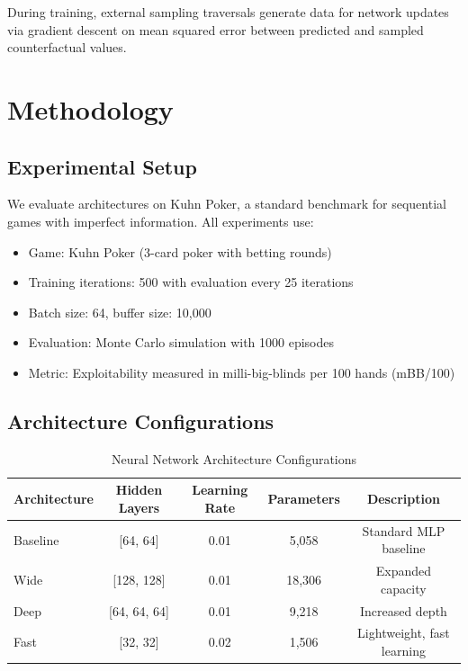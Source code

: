 \documentclass{article}
\begin{document}
During training, external sampling traversals generate data for network updates via gradient descent on mean squared error between predicted and sampled counterfactual values.

\section{Methodology}

\subsection{Experimental Setup}

We evaluate architectures on Kuhn Poker, a standard benchmark for sequential games with imperfect information. All experiments use:

\begin{itemize}
\item Game: Kuhn Poker (3-card poker with betting rounds)
\item Training iterations: 500 with evaluation every 25 iterations
\item Batch size: 64, buffer size: 10,000
\item Evaluation: Monte Carlo simulation with 1000 episodes
\item Metric: Exploitability measured in milli-big-blinds per 100 hands (mBB/100)
\end{itemize}

\subsection{Architecture Configurations}

\begin{table}[h]
\centering
\caption{Neural Network Architecture Configurations}
\label{tab:architectures}
\begin{tabular}{lcccc}
\toprule
Architecture & Hidden Layers & Learning Rate & Parameters & Description \\
\midrule
Baseline & [64, 64] & 0.01 & 5,058 & Standard MLP baseline \\
Wide & [128, 128] & 0.01 & 18,306 & Expanded capacity \\
Deep & [64, 64, 64] & 0.01 & 9,218 & Increased depth \\
Fast & [32, 32] & 0.02 & 1,506 & Lightweight, fast learning \\
\bottomrule
\end{tabular}
\end{table}
\end{document}
